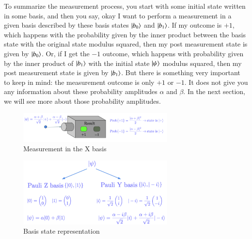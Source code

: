 To summarize the measurement process, you start with some initial state written in some basis,
and then you say, okay I want to perform a measurement in a given basis described by these basis states $\left| b_0 \right\rangle$ and $\left| b_1 \right\rangle$. If my outcome is $+1$, which happens with the probability given by the inner product between the basis state with the original state modulus squared, then my post measurement state is given by $\left| b_0 \right\rangle$. Or, if I get the $-1$ outcome, which happens with probability given by the inner product of $\left| b_1 \right\rangle$ with the initial state $\left| \psi \right\rangle$ modulus squared, then my post measurement state is given by $\left| b_1 \right\rangle$. But there is something very important to keep in mind: the measurement outcome is only $+1$ or $-1$. It does not give you any information about these probability amplitudes $\alpha$ and $\beta$. In the next section, we will see more about those probability amplitudes.


\begin{figure}[H]
    \centering
    \includegraphics[width=0.7\textwidth]{lesson2/Pauli_x_machine.pdf}
    
        \caption{Measurement in the X basis}
    
    \label{fig:x-meas}
\end{figure}

\begin{figure}[H]
    \centering
    \includegraphics[width=0.7\textwidth]{lesson2/basis_representation.pdf}
    
        \caption{Basis state representation}
    
    \label{fig:bases}
\end{figure}

